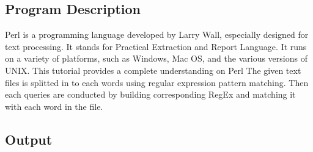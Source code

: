 \documentclass{article}
\begin{document}
\subsection{Program Description}
Perl is a programming language developed by Larry Wall, especially designed
for text processing. It stands for Practical Extraction and Report Language.
It runs on a variety of platforms, such as Windows, Mac OS, and the 
various versions of UNIX. This tutorial provides a complete understanding
on Perl\newline
The given text files is splitted in to each words using regular expression
pattern matching. Then each queries are conducted by building corresponding
RegEx and matching it with each word in the file.

\subsection{Output}
\end{document}
